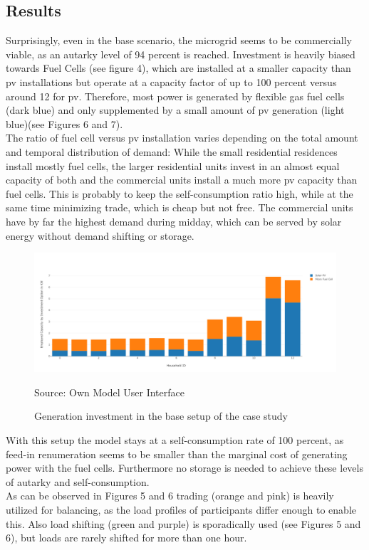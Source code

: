 \documentclass[
	11pt,								%
	DIV10,								%
	a4paper,         					%
	oneside,							%
	headheight=20pt,					%
	footheight=20pt,					%
    parskip=full,						%
    listof=totoc,						%
	bibliography=totoc,					%
	index=totoc,						%
]{scrartcl}
\begin{document}
\subsection{Results}
Surprisingly, even in the base scenario, the microgrid seems to be commercially viable, as an autarky level of 94 percent is reached. Investment is heavily biased towards Fuel Cells (see figure 4), which are installed at a smaller capacity than pv installations but operate at a capacity factor of up to 100 percent versus around 12 for pv. Therefore, most power is generated by flexible gas fuel cells (dark blue) and only supplemented by a small amount of pv generation (light blue)(see Figures 6 and 7).\\
The ratio of fuel cell versus pv installation varies depending on the total amount and temporal distribution of demand: While the small residential residences install mostly fuel cells, the larger residential units invest in an almost equal capacity of both and the commercial units install a much more pv capacity than fuel cells. This is probably to keep the self-consumption ratio high, while at the same time minimizing trade, which is cheap but not free. The commercial units have by far the highest demand during midday, which can be served by solar energy without demand shifting or storage.
\begin{figure}[H]
	\centering
	\includegraphics[width=1\textwidth]{pictures/INV_GEN_Base.png}
	\caption{Generation investment in the base setup of the case study}
	\label{gen_investment_base}
	\flushleft\quad\quad\footnotesize{Source: Own Model User Interface}
\end{figure}
With this setup the model stays at a self-consumption rate of 100 percent, as feed-in renumeration seems to be smaller than the marginal cost of generating power with the fuel cells. Furthermore no storage is needed to achieve these levels of autarky and self-consumption. \\
As can be observed in Figures 5 and 6 trading (orange and pink) is heavily utilized for balancing, as the load profiles of participants differ enough to enable this. Also load shifting (green and purple) is sporadically used (see Figures 5 and 6), but loads are rarely shifted for more than one hour.
\end{document}
